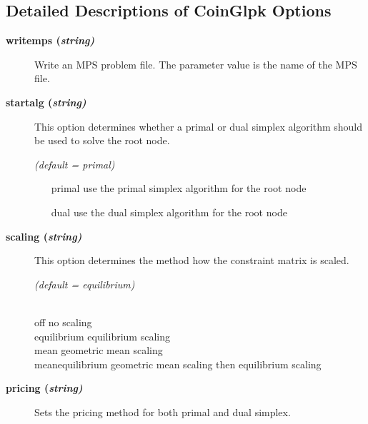 \subsection{Detailed Descriptions of CoinGlpk Options}

\begin{description}

\item[\label{glpkwritemps}\hypertarget{glpkwritemps}
{\textbf{writemps (\slshape{string})}}]\hspace{1.0in}

Write an MPS problem file.
The parameter value is the name of the MPS file.


\item[\label{glpkstartalg}\hypertarget{glpkstartalg}
{\textbf{startalg (\slshape{string})}}]\hspace{1.0in}

This option determines whether a primal or dual simplex algorithm should be used to solve the root node.

\textsl{(default = primal)}
\begin{itemize}
\item[primal] use the primal simplex algorithm for the root node
\item[dual] use the dual simplex algorithm for the root node
\end{itemize}

\item[\label{glpkscaling}\hypertarget{glpkscaling}
{\textbf{scaling (\slshape{string})}}]\hspace{1.0in}

This option determines the method how the constraint matrix is scaled.

\textsl{(default = equilibrium)}
\begin{tabbing}
\hspace{1.1in} \= \\
off \> no scaling \\
equilibrium \> equilibrium scaling \\
mean \> geometric mean scaling \\
meanequilibrium \> geometric mean scaling then equilibrium scaling
\end{tabbing}

\item[\label{pricing}\hypertarget{pricing}
{\textbf{pricing (\slshape{string})}}]\hspace{1.0in}

Sets the pricing method for both primal and dual simplex.


\end{description}

